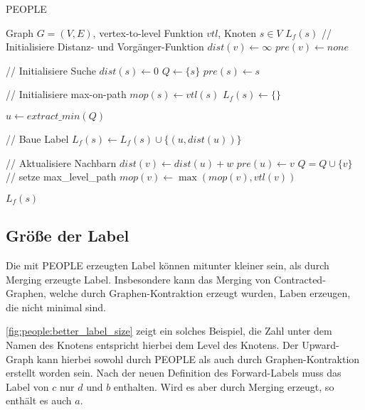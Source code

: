 \begin{algorithm}[p]
  \caption{PEOPLE}
  \begin{algorithmic}[1]
    \Require Graph $G = (V, E)$, vertex-to-level Funktion ${vtl}$, Knoten $s \in V$
    \Ensure $L_f (s)$
    \State // Initialisiere Distanz- und Vorgänger-Funktion
    \State ${dist}(v) \leftarrow \infty$
    \State ${pre}(v) \leftarrow {none}$
    \EndFor

    \State
    \State // Initialisiere Suche
    \State ${dist}(s) \leftarrow 0$
    \State $Q\leftarrow \{ s \}$
    \State ${pre}(s) \leftarrow s$

    \State
    \State // Initialisiere max-on-path
    \State ${mop}(s) \leftarrow {vtl}(s)$
    \State $L_f (s) \leftarrow \{ \}$

    \State
    \State $u \leftarrow{extract\_min}(Q)$

    \State
    \State // Baue Label
    \State $L_f (s) \leftarrow L_f (s) \cup \{ (u, {dist}(u)) \}$
    \EndIf

    \State
    \State // Aktualisiere Nachbarn
    \State ${dist}(v) \leftarrow {dist}(u) + w$
    \State ${pre}(u) \leftarrow v$
    \State $Q = Q \cup \{ v \}$
    \State
    \State // setze max\_level\_path
    \State ${mop}(v) \leftarrow \max({mop}(v), {vtl}(v))$
    \EndIf
    \EndFor

    \EndWhile

    \State
    \State \Return $L_f (s)$
  \end{algorithmic}
  \label{alg:people:people}
\end{algorithm}

\subsection{Größe der Label}\label{subsection:people:label_size}

Die mit PEOPLE erzeugten Label können mitunter kleiner sein, als durch Merging erzeugte Label.
Insbesondere kann das Merging von Contracted-Graphen, welche durch Graphen-Kontraktion erzeugt wurden, Laben erzeugen, die nicht minimal sind.

\autoref{fig:people:better_label_size} zeigt ein solches Beispiel, die Zahl unter dem Namen des Knotens entspricht hierbei dem Level des Knotens.
Der Upward-Graph kann hierbei sowohl durch PEOPLE als auch durch Graphen-Kontraktion erstellt worden sein.
Nach der neuen Definition des Forward-Labels muss das Label von $c$ nur $d$ und $b$ enthalten.
Wird es aber durch Merging erzeugt, so enthält es auch $a$.

